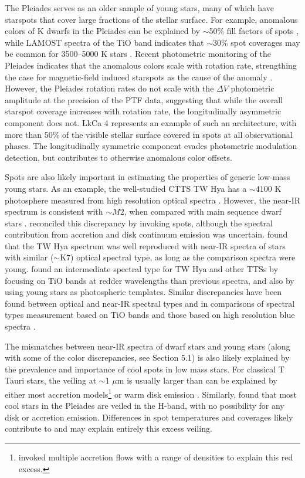 \documentclass[twocolumn]{emulateapj}%
\begin{document}
The Pleiades serves as an older \citep[$\sim125$ Myr][]{stauffer98} sample of young stars, many of which have starspots that cover large fractions of the stellar surface.  For example, anomalous colors of K dwarfs in the Pleiades can be explained by $\sim$50\% fill factors of spots \citep{stauffer03}, while LAMOST spectra of the TiO band indicates that $\sim 30$\% spot coverages may be common for 3500--5000 K stars \citep{fang2016}.  Recent photometric monitoring of the Pleiades indicates that the anomalous colors scale with rotation rate, strengthing the case for magnetic-field induced starspots as the cause of the anomaly \citep{covey16}.  However, the \citet{covey16} Pleiades rotation rates do not scale with the $\Delta V$ photometric amplitude at the precision of the PTF data, suggesting that while the overall starspot coverage increases with rotation rate, the longitudinally asymmetric component does not.  LkCa 4 represents an example of such an architecture, with more than  50\% of the visible stellar surface covered in spots at all observational phases. The longitudinally symmetric component evades photometric modulation detection, but contributes to otherwise anomalous color offsets.

Spots are also likely important in estimating the properties of generic low-mass young stars. As an example, the well-studied CTTS TW Hya has a $\sim 4100$ K photosphere measured from high resolution optical spectra \citep[e.g.][]{yang05}.  However, the near-IR spectrum is consistent with $\sim M2$, when compared with main sequence dwarf stars \citep{vacca11}.  \citet{debes13} reconciled this discrepancy by invoking spots, although the spectral contribution from accretion and disk continuum emission was uncertain.  \citet{mcclure13} found that the TW Hya spectrum was well reproduced with near-IR spectra of stars with similar ($\sim$K7) optical spectral type, as long as the comparison spectra were young.   \citet{herczeg14} found an intermediate spectral type for TW Hya and other TTSs by focusing on TiO bands at redder wavelengths than previous spectra, and also by using young stars as photospheric templates.  Similar discrepancies have been found between optical and near-IR spectral types \citep[e.g.][]{bouvier92,bary14,cottaar14} and in comparisons of spectral types measurement based on TiO bands and those based on high resolution blue spectra \citep[see discussion in][]{herczeg14}.

The mismatches between near-IR spectra of dwarf stars and young stars (along with some of the color discrepancies, see Section 5.1) is also likely explained by the prevalence and importance of cool spots in low mass stars.  For classical T Tauri stars, the veiling at $\sim 1$ $\mu$m is usually larger than can be explained by either most accretion models\footnote{\citet{ingleby13} invoked multiple accretion flows with a range of densities to explain this red excess.} or warm disk emission \citep[e.g.][]{basri90,cieza05,fischer11,mcclure13}.  Similarly, \citet{cottaar14} found that most cool stars in the Pleiades are veiled in the H-band, with no possibility for any disk or accretion emission.  Differences in spot temperatures and coverages likely contribute to and may explain entirely this excess veiling.
\end{document}
